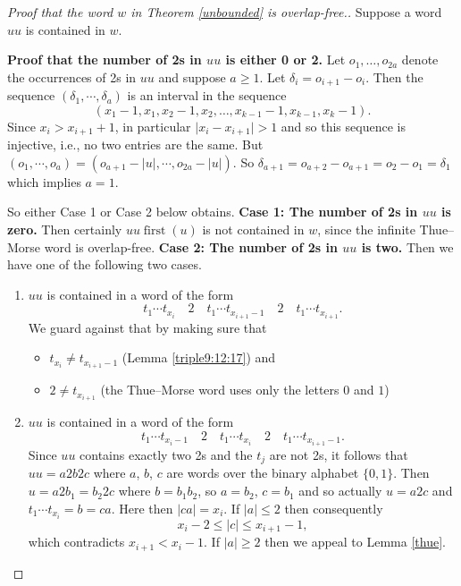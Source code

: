 \documentclass[12pt]{article}
\newcommand{\abs}[1]{\lvert#1\rvert}
\theoremstyle{plain}
\theoremstyle{definition}
\theoremstyle{remark}
\DeclareMathOperator{\first}{first}
\begin{document}
			\begin{proof}[Proof that the word $w$ in Theorem \ref{unbounded} is overlap-free.]
				Suppose a word $uu$ is contained in $w$.
			
				\textbf{Proof that the number of 2s in $uu$ is either 0 or 2.}
				Let $o_1, \ldots, o_{2a}$ denote the occurrences of 2s in $uu$ and suppose $a\ge 1$.
				Let $\delta_i = o_{i+1} - o_i$.
				Then the sequence $(\delta_1, \cdots, \delta_a)$ is an interval in the sequence
				\[
					(x_1 - 1, x_1, x_2 - 1, x_2, \ldots, x_{k - 1} - 1, x_{k - 1}, x_k - 1).
				\]
				Since $x_i > x_{i+1} + 1$, in particular $\abs{x_i - x_{i+1}}>1$ and so this sequence is injective, i.e.,
				no two entries are the same.
				But $(o_1, \cdots, o_a) = (o_{a+1} - \abs{u}, \cdots, o_{2a} - \abs{u})$.
				So $\delta_{a+1} = o_{a+2}-o_{a+1} = o_2 - o_1 = \delta_1$ which implies $a=1$.

				So either Case 1 or Case 2 below obtains.
				\textbf{Case 1: The number of 2s in $uu$ is zero.} Then certainly $uu\first(u)$ is not contained in $w$,
				since the infinite Thue--Morse word is overlap-free.
				\textbf{Case 2: The number of 2s in $uu$ is two.}
				Then we have one of the following two cases.
				\begin{enumerate}
					\item $uu$ is contained in a word of the form
						\[
							t_1 \cdots t_{x_i}\quad 2\quad t_1 \cdots t_{x_{i+1}-1}\quad 2\quad t_1 \cdots t_{x_{i+1}}.
						\]
						We guard against that by making sure that
						\begin{itemize}
							\item{} $t_{x_i}\ne t_{x_{i+1}-1}$ (Lemma \ref{triple9:12:17}) and
							\item{} $2\ne t_{x_{i+1}}$ (the Thue--Morse word uses only the letters $0$ and $1$)
						\end{itemize}
					\item $uu$ is contained in a word of the form
						\[
							t_1 \cdots t_{x_i-1}\quad 2\quad t_1 \cdots t_{x_i}\quad 2\quad t_1 \cdots t_{x_{i+1}-1}.
						\]
						Since $uu$ contains exactly two 2s and the $t_j$ are not 2s, it follows that
						$uu=a2b2c$ where $a$, $b$, $c$ are words over the
						binary alphabet $\{0,1\}$.
						Then $u=a2{b_1}={b_2}2c$ where $b={b_1}{b_2}$, so $a=b_2$, $c=b_1$ and so actually $u=a2c$ and $t_1 \cdots t_{x_i}=b=ca$.
						Here then $\abs{ca}=x_i$.
						If $\abs{a}\le 2$ then consequently
						\[
							x_i - 2 \le \abs{c} \le x_{i + 1} - 1,
						\]
						which contradicts $x_{i+1}<x_i-1$. If $\abs{a}\ge 2$ then we appeal to Lemma \ref{thue}.
				\end{enumerate}
			\end{proof}
\end{document}
